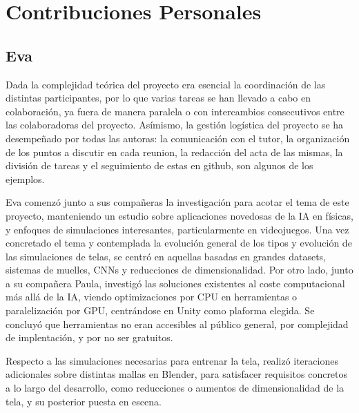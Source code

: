 \chapter*{Contribuciones Personales}
\label{cap:contribucionesPersonales}

\section*{Eva}
Dada la complejidad teórica del proyecto era esencial la coordinación de las distintas participantes, por lo que varias tareas se han llevado a cabo en colaboración, ya fuera de manera paralela o con intercambios consecutivos entre las colaboradoras del proyecto. Asímismo, la gestión logística del proyecto se ha desempeñado por todas las autoras: la comunicación con el tutor, la organización de los puntos a discutir en cada reunion, la redacción del acta de las mismas, la división de tareas y el seguimiento de estas en github, son algunos de los ejemplos. \newline

Eva comenzó junto a sus compañeras la investigación para acotar el tema de este proyecto, manteniendo un estudio sobre aplicaciones novedosas de la IA en físicas, y enfoques de simulaciones interesantes, particularmente en videojuegos. Una vez concretado el tema y contemplada la evolución general de los tipos y evolución de las simulaciones de telas, se centró en aquellas basadas en grandes datasets, sistemas de muelles, CNNs y reducciones de dimensionalidad. Por otro lado, junto a su compañera Paula, investigó las soluciones existentes al coste computacional más allá de la IA, viendo optimizaciones por CPU en herramientas o paralelización por GPU, centrándose en Unity como plaforma elegida. Se concluyó que herramientas no eran accesibles al público general, por complejidad de implentación, y por no ser gratuitos. \newline

Respecto a las simulaciones necesarias para entrenar la tela, realizó iteraciones adicionales sobre distintas mallas en Blender, para satisfacer requisitos concretos a lo largo del desarrollo, como reducciones o aumentos de dimensionalidad de la tela, y su posterior puesta en escena. \newline

